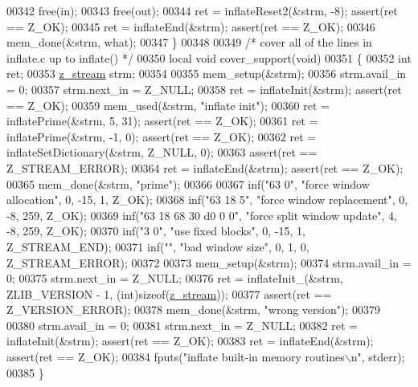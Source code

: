 \begin{DoxyCode}
{{{{{00342     free(in);
00343     free(out);
00344     ret = inflateReset2(&strm, -8);             assert(ret == Z\_OK);
00345     ret = inflateEnd(&strm);                    assert(ret == Z\_OK);
00346     mem\_done(&strm, what);
00347 \}
00348 
00349 \textcolor{comment}{/* cover all of the lines in inflate.c up to inflate() */}
00350 local \textcolor{keywordtype}{void} cover\_support(\textcolor{keywordtype}{void})
00351 \{
00352     \textcolor{keywordtype}{int} ret;
00353     \hyperlink{structz__stream__s}{z\_stream} strm;
00354 
00355     mem\_setup(&strm);
00356     strm.avail\_in = 0;
00357     strm.next\_in = Z\_NULL;
00358     ret = inflateInit(&strm);                   assert(ret == Z\_OK);
00359     mem\_used(&strm, \textcolor{stringliteral}{"inflate init"});
00360     ret = inflatePrime(&strm, 5, 31);           assert(ret == Z\_OK);
00361     ret = inflatePrime(&strm, -1, 0);           assert(ret == Z\_OK);
00362     ret = inflateSetDictionary(&strm, Z\_NULL, 0);
00363                                                 assert(ret == Z\_STREAM\_ERROR);
00364     ret = inflateEnd(&strm);                    assert(ret == Z\_OK);
00365     mem\_done(&strm, \textcolor{stringliteral}{"prime"});
00366 
00367     inf(\textcolor{stringliteral}{"63 0"}, \textcolor{stringliteral}{"force window allocation"}, 0, -15, 1, Z\_OK);
00368     inf(\textcolor{stringliteral}{"63 18 5"}, \textcolor{stringliteral}{"force window replacement"}, 0, -8, 259, Z\_OK);
00369     inf(\textcolor{stringliteral}{"63 18 68 30 d0 0 0"}, \textcolor{stringliteral}{"force split window update"}, 4, -8, 259, Z\_OK);
00370     inf(\textcolor{stringliteral}{"3 0"}, \textcolor{stringliteral}{"use fixed blocks"}, 0, -15, 1, Z\_STREAM\_END);
00371     inf(\textcolor{stringliteral}{""}, \textcolor{stringliteral}{"bad window size"}, 0, 1, 0, Z\_STREAM\_ERROR);
00372 
00373     mem\_setup(&strm);
00374     strm.avail\_in = 0;
00375     strm.next\_in = Z\_NULL;
00376     ret = inflateInit\_(&strm, ZLIB\_VERSION - 1, (\textcolor{keywordtype}{int})\textcolor{keyword}{sizeof}(\hyperlink{structz__stream__s}{z\_stream}));
00377                                                 assert(ret == Z\_VERSION\_ERROR);
00378     mem\_done(&strm, \textcolor{stringliteral}{"wrong version"});
00379 
00380     strm.avail\_in = 0;
00381     strm.next\_in = Z\_NULL;
00382     ret = inflateInit(&strm);                   assert(ret == Z\_OK);
00383     ret = inflateEnd(&strm);                    assert(ret == Z\_OK);
00384     fputs(\textcolor{stringliteral}{"inflate built-in memory routines\(\backslash\)n"}, stderr);
00385 \}
}}}}}
\end{DoxyCode}
